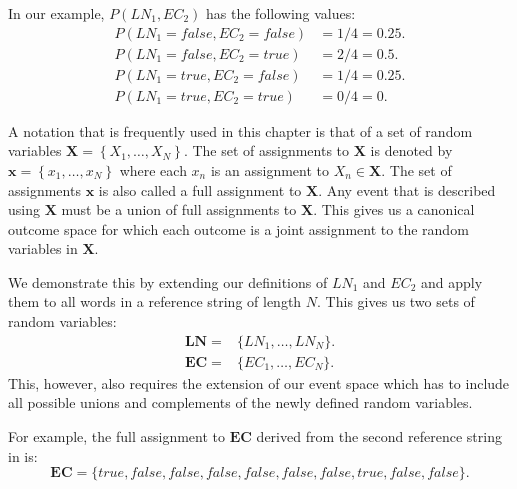 In our example, $P(LN_1,EC_2)$ has the following values:
\begin{equation*}
  \begin{split}
    P(LN_1{=}\mathit{false},EC_2{=}\mathit{false})&=1/4=0.25.\\
    P(LN_1{=}\mathit{false},EC_2{=}\mathit{true})&=2/4=0.5.\\
    P(LN_1{=}\mathit{true},EC_2{=}\mathit{false})&=1/4=0.25.\\
    P(LN_1{=}\mathit{true},EC_2{=}\mathit{true})&=0/4=0.
  \end{split}
\end{equation*}

\bigskip

A notation that is frequently used in this chapter is that of a set of \glspl{random variable} $\mathbf{X}=\left\{ X_1,\dots,X_N\right\}$.
The set of \glspl{assignment} to $\mathbf{X}$ is denoted by $\mathbf{x}=\left\{ x_1,\dots,x_N\right\}$ where each $x_n$ is an \gls{assignment} to $X_n\in\mathbf{X}$.
The set of \glspl{assignment} $\mathbf{x}$ is also called a \gls{full assignment} to $\mathbf{X}$.
Any \gls{event} that is described using $\mathbf{X}$ must be a union of \glspl{full assignment} to $\mathbf{X}$.
This gives us a \gls{canonical outcome space} for which each outcome is a joint \gls{assignment} to the \glspl{random variable} in $\mathbf{X}$.

We demonstrate this by extending our definitions of $LN_1$ and $EC_2$ and apply them to all words in a reference string of length $N$.
This gives us two sets of \glspl{random variable}:
\begin{equation*}
  \begin{split}
    \mathbf{LN}=& \{LN_1, \dots, LN_N\}.\\
    \mathbf{EC}=& \{EC_1, \dots, EC_N\}.
  \end{split}
\end{equation*}
This, however, also requires the extension of our \gls{event space}  which has to include all possible unions and complements of the newly defined \glspl{random variable}.

For example, the \gls{full assignment} to $\mathbf{EC}$ derived from the second reference string in  is:
\begin{equation*}
  \mathbf{EC}=\{\mathit{true}, \mathit{false}, \mathit{false}, \mathit{false}, \mathit{false}, \mathit{false}, \mathit{false}, \mathit{true}, \mathit{false}, \mathit{false}\}.
\end{equation*}

